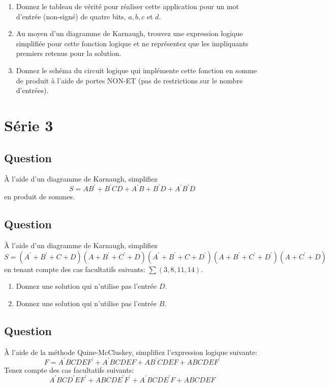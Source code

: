 \documentclass[letter, oneside]{book}
\begin{document}
\begin{enumerate}
\item Donnez le tableau de vérité pour réaliser cette application pour
un mot d'entrée (non-signé) de quatre bits, \(a, b, c\) et \(d\).

\item Au moyen d'un diagramme de Karnaugh, trouvez une expression
logique simplifiée pour cette fonction logique et ne représentez
que les impliquants premiers retenus pour la solution.

\item Donnez le schéma du circuit logique qui implémente cette fonction
en somme de produit à l'aide de portes NON-ET (pas de restrictions
sur le nombre d'entrées).
\end{enumerate}

\chapter*{Série 3}
\label{sec:orge7142f8}
\section*{Question}
\label{sec:orga889268}
À l'aide d'un diagramme de Karnaugh, simplifiez 
  $$
    S = A B^\prime +
    B^\prime CD + A^\prime B + B^\prime D + A^\prime B^\prime D
    $$
  en produit de sommes.

\section*{Question}
\label{sec:orgc8505b3}
À l'aide d'un diagramme de Karnaugh, simplifiez 
  $$
    S = ( A^\prime +
    B^\prime + C + D)(A+B^\prime +C^\prime +D)(A^\prime +B^\prime
    +C+D^\prime )(A+B^\prime +C^\prime +D^\prime )(A+C^\prime +D)
    $$
  en tenant compte des cas facultatifs suivants: \(\sum(3,8,11,14)\).
\begin{enumerate}
\item Donnez une solution qui n'utilise pas l'entrée \(D\).
\item Donnez une solution qui n'utilise pas l'entrée \(B\).
\end{enumerate}

\section*{Question}
\label{sec:org89eafd6}
À l'aide de la méthode Quine-McCluskey, simplifiez l'expression
  logique suivante: 
  $$
    F= A^\prime BCDEF^\prime  + A^\prime BCDEF+ AB^\prime CDEF+ ABCDEF^\prime 
    $$
  Tenez compte des cas facultatifs suivants: 
  $$
    A^\prime BCD^\prime EF^\prime +
    ABCDE^\prime F^\prime + A^\prime BCDE^\prime F+ ABCDEF
    $$
\end{document}
